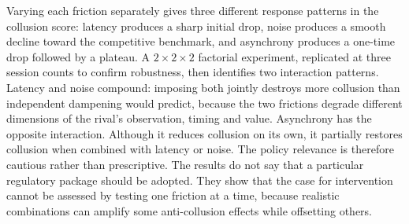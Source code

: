 Varying each friction separately gives three different response patterns in the collusion score: latency produces a sharp initial drop, noise produces a smooth decline toward the competitive benchmark, and asynchrony produces a one-time drop followed by a plateau. A $2\times 2\times 2$ factorial experiment, replicated at three session counts to confirm robustness, then identifies two interaction patterns. Latency and noise compound: imposing both jointly destroys more collusion than independent dampening would predict, because the two frictions degrade different dimensions of the rival's observation, timing and value. Asynchrony has the opposite interaction. Although it reduces collusion on its own, it partially restores collusion when combined with latency or noise. The policy relevance is therefore cautious rather than prescriptive. The results do not say that a particular regulatory package should be adopted. They show that the case for intervention cannot be assessed by testing one friction at a time, because realistic combinations can amplify some anti-collusion effects while offsetting others.
